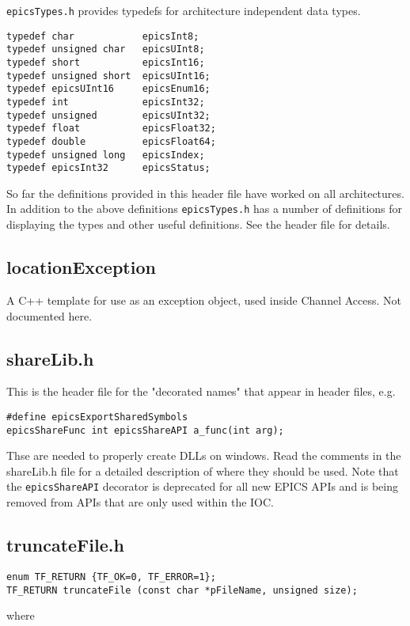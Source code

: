 \verb|epicsTypes.h| provides typedefs for architecture independent data types.

\begin{verbatim}typedef char            epicsInt8;
typedef unsigned char   epicsUInt8;
typedef short           epicsInt16;
typedef unsigned short  epicsUInt16;
typedef epicsUInt16     epicsEnum16;
typedef int             epicsInt32;
typedef unsigned        epicsUInt32;
typedef float           epicsFloat32;
typedef double          epicsFloat64;
typedef unsigned long   epicsIndex;
typedef epicsInt32      epicsStatus;
\end{verbatim}So far the definitions provided in this header file have worked on all architectures. In addition to the above definitions 
\verb|epicsTypes.h| has a number of definitions for displaying the types and other useful definitions. See the header file for 
details.

\subsection{locationException}

A C++ template for use as an exception object, used inside Channel Access. Not documented here.

\subsection{shareLib.h}

This is the header file for the "decorated names" that appear in header files, e.g.

\begin{verbatim}#define epicsExportSharedSymbols
epicsShareFunc int epicsShareAPI a_func(int arg);
\end{verbatim}
Thse are needed to properly create DLLs on windows. Read the comments in the shareLib.h file for a detailed description 
of where they should be used. Note that the \verb|epicsShareAPI| decorator is deprecated for all new EPICS APIs and is 
being removed from APIs that are only used within the IOC.

\subsection{truncateFile.h}

\begin{verbatim}enum TF_RETURN {TF_OK=0, TF_ERROR=1};
TF_RETURN truncateFile (const char *pFileName, unsigned size);
\end{verbatim}where

